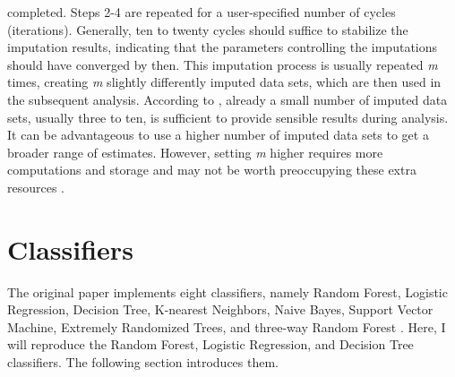 completed. Steps 2-4 are repeated for a user-specified number of cycles 
(iterations). 
Generally, ten to twenty cycles should suffice to stabilize the imputation 
results, indicating that the parameters controlling the imputations should have 
converged by then. This imputation process is usually repeated \textit{m} 
times, creating \textit{m} slightly differently imputed data sets, which are 
then used in the subsequent analysis. According to \cite{RN144, RN141, RN142}, 
already a 
small number of imputed data sets, usually three to ten, is sufficient to 
provide sensible results during analysis. It can be advantageous 
to use a higher number of imputed data sets to get a broader range of 
estimates. However, setting \textit{m} higher requires more computations and 
storage 
and may not be worth preoccupying these extra resources \cite{RN144}.

\section{Classifiers}
The original paper implements eight classifiers, namely Random 
Forest, Logistic Regression, Decision Tree, K-nearest Neighbors, Naive Bayes, 
Support Vector Machine, Extremely Randomized Trees, and three-way Random 
Forest \cite{RN127}. 
Here, I will reproduce the Random Forest, Logistic Regression, and Decision 
Tree classifiers. The following section introduces them.
